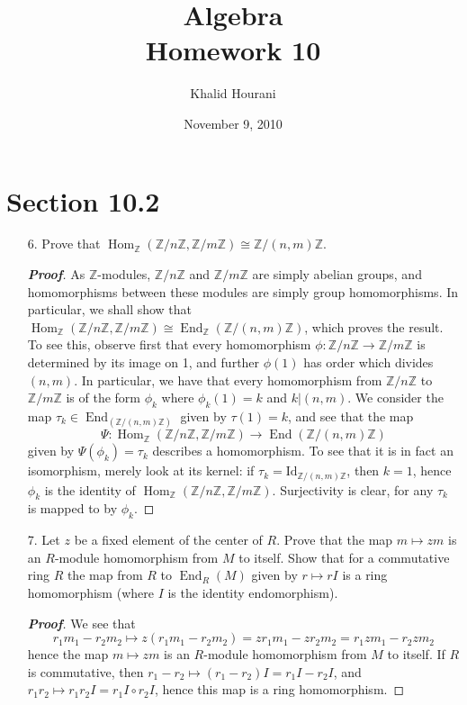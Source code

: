 \documentclass[12pt,leqno]{book}
\title{Algebra\\\large Homework 10}
\date{November 9, 2010}
\author{Khalid Hourani}
\theoremstyle{definition}
\newcommand{\Hom}{\operatorname{Hom}}
\newcommand{\End}{\operatorname{End}}
\newcommand{\Z}{\mathbb{Z}}
\newenvironment{Proof}{\begin{proof}[\textnormal{\textbf{Proof}}]}{\end{proof}}
\begin{document}
 \begin{titlepage}
  \maketitle
 \end{titlepage}

\section*{Section 10.2}
\begin{enumerate}
 \item [6.] Prove that $\Hom_{\Z}(\Z/n\Z,\Z/m\Z)\cong\Z/(n,m)\Z$.

\begin{Proof}
 As $\Z$-modules, $\Z/n\Z$ and $\Z/m\Z$ are simply abelian groups, and homomorphisms between these modules are simply group homomorphisms. In particular, we shall show that $\Hom_{\Z}(\Z/n\Z,\Z/m\Z)\cong\End_{\Z}(\Z/(n,m)\Z)$, which proves the result. To see this, observe first that every homomorphism $\phi:\Z/n\Z\to\Z/m\Z$ is determined by its image on 1, and further $\phi(1)$ has order which divides $(n,m)$. In particular, we have that every homomorphism from $\Z/n\Z$ to $\Z/m\Z$ is of the form $\phi_k$ where $\phi_k(1)=k$ and $k|(n,m)$. We consider the map $\tau_k\in\End_(\Z/(n,m)\Z)$ given by $\tau(1)=k$, and see that the map \[\Psi:\Hom_{\Z}(\Z/n\Z,\Z/m\Z)\to\End(\Z/(n,m)\Z)\] given by $\Psi(\phi_k)=\tau_k$ describes a homomorphism. To see that it is in fact an isomorphism, merely look at its kernel: if $\tau_k=\text{Id}_{\Z/(n,m)\Z}$, then $k=1$, hence $\phi_k$ is the identity of $\Hom_{\Z}(\Z/n\Z,\Z/m\Z)$. Surjectivity is clear, for any $\tau_k$ is mapped to by $\phi_k$.
\end{Proof}

 \item [7.] Let $z$ be a fixed element of the center of $R$. Prove that the map $m\mapsto zm$ is an $R$-module homomorphism from $M$ to itself. Show that for a commutative ring $R$ the map from $R$ to $\End_R(M)$ given by $r\mapsto rI$ is a ring homomorphism (where $I$ is the identity endomorphism).

\begin{Proof}
 We see that \[r_1m_1-r_2m_2\mapsto z(r_1m_1-r_2m_2)=zr_1m_1-zr_2m_2=r_1zm_1-r_2zm_2\] hence the map $m\mapsto zm$ is an $R$-module homomorphism from $M$ to itself. If $R$ is commutative, then $r_1-r_2\mapsto (r_1-r_2)I=r_1I-r_2I$, and $r_1r_2\mapsto r_1r_2I=r_1I\circ r_2I$, hence this map is a ring homomorphism.
\end{Proof}


\end{enumerate}
\end{document}
